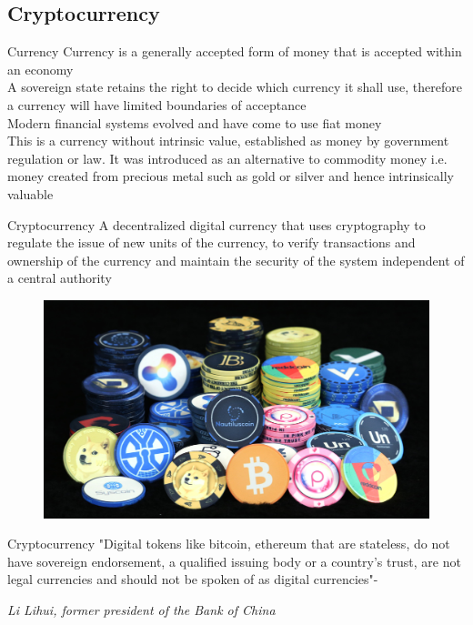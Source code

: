 \documentclass[9pt]{beamer}
\begin{document}

\subsection{Cryptocurrency}

\begin{frame}{Currency}
	Currency is a generally accepted form of money that is accepted within an economy\\ \vspace{3mm}
	A sovereign state retains the right to decide which currency it shall use, therefore a currency will have limited boundaries of acceptance \\ \vspace{3mm}
	Modern financial systems evolved and have come to use fiat money\\ \vspace{3mm}
	This is a currency without intrinsic value, established as money by government regulation or law. It was introduced as an alternative to commodity money i.e. money created from precious metal such as gold or silver and hence intrinsically valuable
\end{frame}


\begin{frame}{Cryptocurrency}
	A decentralized digital currency that uses cryptography to regulate the issue of new units of the currency, to verify transactions and ownership of the currency and maintain the security of the system independent of a central authority
	\begin{figure}[]
		\centering
		\includegraphics  [width=2.in]{Images/cryptocurrency}
	\end{figure}
\end{frame}



\begin{frame}{Cryptocurrency}
	"Digital tokens like bitcoin, ethereum that are stateless, do not have sovereign endorsement, a qualified issuing body or a country's trust, are not legal currencies and should not be spoken of as digital currencies"- \begin{scriptsize}
	\textit{Li Lihui, former president of the Bank of China}
	\end{scriptsize}
\end{frame}
\end{document}
